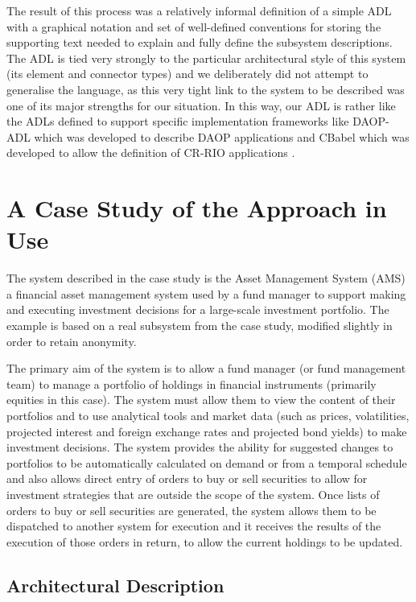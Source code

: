   The result of this process was a relatively informal definition of a simple ADL with a graphical notation and set of well-defined conventions for storing the supporting text needed to explain and fully define the subsystem descriptions.  The ADL is tied very strongly to the particular architectural style of this system (its element and connector types) and we deliberately did not attempt to generalise the language, as this very tight link to the system to be described was one of its major strengths for our situation.  In this way, our ADL is rather like the ADLs defined to support specific implementation frameworks like DAOP-ADL \cite{pinto2003-daopadl} which was developed to describe DAOP applications \cite{pinto2001-daop} and CBabel \cite{rademaker2005-cbabel} which was developed to allow the definition of CR-RIO applications \cite{loques2004-crrio}.

\section{A Case Study of the Approach in Use}

  The system described in the case study is the Asset Management System (AMS) a financial asset management system used by a fund manager to support making and executing investment decisions for a large-scale investment portfolio.  The example is based on a real subsystem from the case study, modified slightly in order to retain anonymity.

  The primary aim of the system is to allow a fund manager (or fund management team) to manage a portfolio of holdings in financial instruments (primarily equities in this case).  The system must allow them to view the content of their portfolios and to use analytical tools and market data (such as prices, volatilities, projected interest and foreign exchange rates and projected bond yields) to make investment decisions.  The system provides the ability for suggested changes to portfolios to be automatically calculated on demand or from a temporal schedule and also allows direct entry of orders to buy or sell securities to allow for investment strategies that are outside the scope of the system.  Once lists of orders to buy or sell securities are generated, the system allows them to be dispatched to another system for execution and it receives the results of the execution of those orders in return, to allow the current holdings to be updated.

\subsection{Architectural Description}

